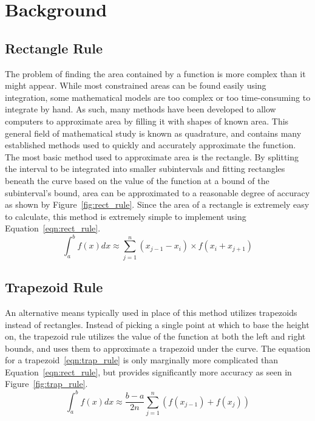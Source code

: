 \documentclass{paper}
\begin{document}
\thispagestyle{empty}
\insertTitlePage
\thispagestyle{empty}
\tableofcontents
\newpage
\setcounter{page}{1}

\section{Background}
\subsection{Rectangle Rule}
The problem of finding the area contained by a function is more complex than it might appear.
While most constrained areas can be found easily using integration, some mathematical models are too complex or too time-consuming to integrate by hand.
As such, many methods have been developed to allow computers to approximate area by filling it with shapes of known area.
This general field of mathematical study is known as quadrature, and contains many established methods used to quickly and accurately approximate the function.
The most basic method used to approximate area is the rectangle.
By splitting the interval to be integrated into smaller subintervals and fitting rectangles beneath the curve based on the value of the function at a bound of the subinterval's bound, area can be approximated to a reasonable degree of accuracy as shown by Figure~\ref{fig:rect_rule}.
Since the area of a rectangle is extremely easy to calculate, this method is extremely simple to implement using Equation~\ref{eqn:rect_rule}.
% 
\begin{equation}
    \label{eqn:rect_rule}
    \int_a^b f(x) dx \approx \sum_{j=1}^n (x_{j-1} - x_i) \times f(x_i + x_{j+1})
\end{equation}
% 

% 
\subsection{Trapezoid Rule}
An alternative means typically used in place of this method utilizes trapezoids instead of rectangles.
Instead of picking a single point at which to base the height on, the trapezoid rule utilizes the value of the function at both the left and right bounds, and uses them to approximate a trapezoid under the curve.
The equation for a trapezoid~\eqref{eqn:trap_rule} is only marginally more complicated than Equation~\ref{eqn:rect_rule}, but provides significantly more accuracy as seen in Figure~\ref{fig:trap_rule}.
% 
\begin{equation}
    \label{eqn:trap_rule}
    \int_a^b f(x) dx \approx \dfrac{b - a}{2n} \sum_{j=1}^n (f(x_{j-1})+f(x_{j}))
\end{equation}
% 

% 
\end{document}
